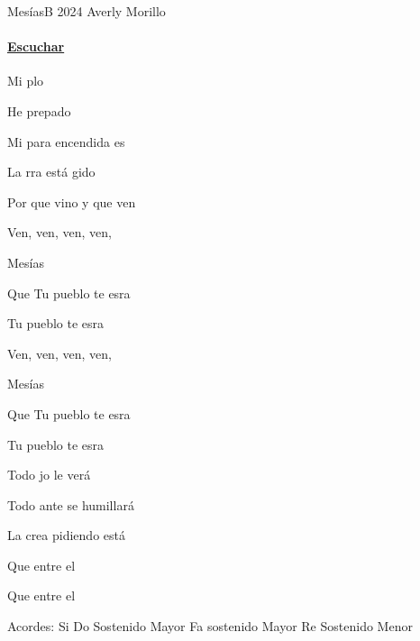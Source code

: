 \documentclass[12pt, spanish]{book}
\begin{document}
    \begin{song}{Mesías}{B}
        {2024} %
        {Averly Morillo}
        {} %
        {}
        \ifChordBk
        \paragraph{\mbox{}\hfill\protect\href{https://open.spotify.com/intl-es/track/2f76xe9iPZbab7nMXaUaNR}{Escuchar}\mbox{}\hfill}
        \fi


        \begin{SBOpGroup}
            Mi plo

            He prepado

            Mi para encendida es

            La rra está gido

            Por  que vino y que ven
        \end{SBOpGroup}

        \begin{SBChorus}
            Ven, ven, ven, ven, 

            Mesías 

            Que Tu pueblo te esra

            Tu pueblo te esra

            Ven, ven, ven, ven, 

            Mesías 

            Que Tu pueblo te esra

            Tu pueblo te esra
        \end{SBChorus}


        \begin{SBOpGroup}
            Todo jo le verá

            Todo ante  se humillará

            La crea pidiendo está

            Que entre el 

            Que entre el 
        \end{SBOpGroup}

        \ifChordBk
        \begin{SBOpGroup}
            Acordes:\break
            \upchord{\B}\qquad Si \hfill\null\break
            \upchord{\Cs}\qquad Do Sostenido Mayor \hfill\null\break
            \upchord{\Fs}Fa sostenido Mayor \hfill
            \upchord{\Dsm}\qquad Re Sostenido Menor \hfill\null\break
        \end{SBOpGroup}
        \fi

    \end{song}
\end{document}
